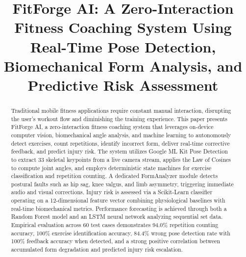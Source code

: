 \documentclass[conference]{IEEEtran}
\begin{document}
\title{FitForge AI: A Zero-Interaction Fitness Coaching System Using Real-Time Pose Detection, Biomechanical Form Analysis, and Predictive Risk Assessment}

\author{
\and
{}
}

\maketitle

\begin{abstract}
Traditional mobile fitness applications require constant manual interaction, disrupting the user's workout flow and diminishing the training experience. This paper presents FitForge AI, a zero-interaction fitness coaching system that leverages on-device computer vision, biomechanical angle analysis, and machine learning to autonomously detect exercises, count repetitions, identify incorrect form, deliver real-time corrective feedback, and predict injury risk. The system utilizes Google ML Kit Pose Detection to extract 33 skeletal keypoints from a live camera stream, applies the Law of Cosines to compute joint angles, and employs deterministic state machines for exercise classification and repetition counting. A dedicated FormAnalyzer module detects postural faults such as hip sag, knee valgus, and limb asymmetry, triggering immediate audio and visual corrections. Injury risk is assessed via a Scikit-Learn classifier operating on a 12-dimensional feature vector combining physiological baselines with real-time biomechanical metrics. Performance forecasting is achieved through both a Random Forest model and an LSTM neural network analyzing sequential set data. Empirical evaluation across 60 test cases demonstrates 94.0\% repetition counting accuracy, 100\% exercise identification accuracy, 84.4\% wrong pose detection rate with 100\% feedback accuracy when detected, and a strong positive correlation between accumulated form degradation and predicted injury risk escalation.
\end{abstract}
\end{document}
